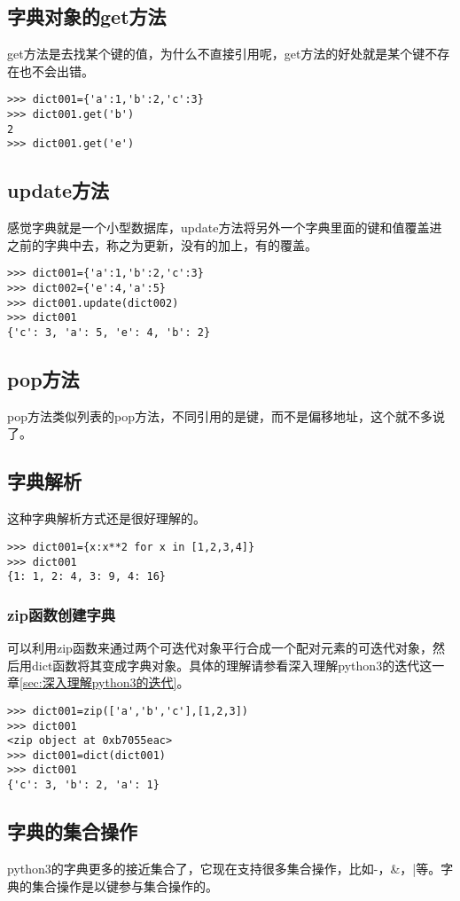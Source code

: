 \documentclass[12pt,oneside]{book}
\begin{document}
\begin{common-format}
\subsection{字典对象的get方法}
get方法是去找某个键的值，为什么不直接引用呢，get方法的好处就是某个键不存在也不会出错。
\begin{Verbatim}
>>> dict001={'a':1,'b':2,'c':3}
>>> dict001.get('b')
2
>>> dict001.get('e')
\end{Verbatim}

\subsection{update方法}
感觉字典就是一个小型数据库，update方法将另外一个字典里面的键和值覆盖进之前的字典中去，称之为更新，没有的加上，有的覆盖。
\begin{Verbatim}
>>> dict001={'a':1,'b':2,'c':3}
>>> dict002={'e':4,'a':5}
>>> dict001.update(dict002)
>>> dict001
{'c': 3, 'a': 5, 'e': 4, 'b': 2}
\end{Verbatim}

\subsection{pop方法}
pop方法类似列表的pop方法，不同引用的是键，而不是偏移地址，这个就不多说了。



\subsection{字典解析}
这种字典解析方式还是很好理解的。
\begin{Verbatim}
>>> dict001={x:x**2 for x in [1,2,3,4]}
>>> dict001
{1: 1, 2: 4, 3: 9, 4: 16}
\end{Verbatim}

\subsubsection{zip函数创建字典}
可以利用zip函数来通过两个可迭代对象平行合成一个配对元素的可迭代对象，然后用dict函数将其变成字典对象。具体的理解请参看深入理解python3的迭代这一章\ref{sec:深入理解python3的迭代}。
\begin{Verbatim}
>>> dict001=zip(['a','b','c'],[1,2,3])
>>> dict001
<zip object at 0xb7055eac>
>>> dict001=dict(dict001)
>>> dict001
{'c': 3, 'b': 2, 'a': 1}
\end{Verbatim}



\subsection{字典的集合操作}
python3的字典更多的接近集合了，它现在支持很多集合操作，比如-，\&{}，|等。字典的集合操作是以键参与集合操作的。



\end{common-format}
\end{document}
